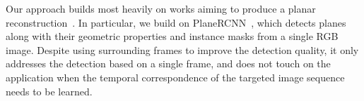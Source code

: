 Our approach builds most heavily on works aiming to produce a planar reconstruction~\cite{liu2018planenet,yang2018recovering,liu2019planercnn,YuZLZG19,chen2020oasis,jiang2020peek}. In particular, we build on PlaneRCNN~\cite{liu2019planercnn}, which detects planes along with their geometric properties and instance masks from a single RGB image. Despite using surrounding frames to improve the detection quality, it only addresses the detection based on a single frame, and does not touch on the application when the temporal correspondence of the targeted image sequence needs to be learned. 




